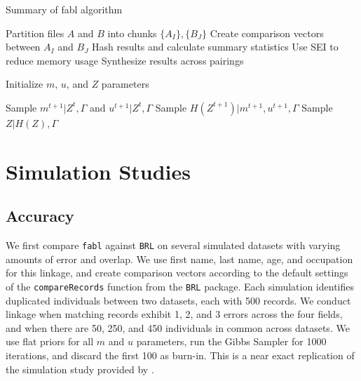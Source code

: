 \documentclass[12pt,letterpaper]{article}
\newcommand{\1}[1]{\mathbb{I}\!\left[#1\right]} %
\begin{document}
\begin{algorithm}
	\caption{Summary of fabl algorithm}
	\begin{algorithmic}[1]
		
		\State Partition files $A$ and $B$ into chunks $\{A_I\}, \{B_J\}$
		\State Create comparison vectors between $A_I$ and $B_J$
		\State Hash results and calculate summary statistics
		\State Use SEI to reduce memory usage
		\EndFor
		\State Synthesize results across pairings
		\EndProcedure
		
		\State Initialize $m$, $u$, and $Z$ parameters
		
		\State Sample $m^{t+1}|Z^{t}, \Gamma$ and  $u^{t+1}|Z^{t}, \Gamma$ 
		\State Sample $H\left(Z^{t+1}\right)|m^{t+1}, u^{t+1}, \Gamma$  
		\EndFor
		\State Sample $Z | H(Z), \Gamma$ 

		\EndProcedure
		
	\end{algorithmic}
\end{algorithm}

\section{Simulation Studies}
\label{sec:simulations}

\hypertarget{accuracy}{%
	\subsection{Accuracy}\label{accuracy}}

We first compare \texttt{fabl} against \texttt{BRL} on several simulated datasets with varying amounts of error and overlap. We use first name, last name, age, and occupation for this linkage, and create comparison vectors according to the default settings of the \texttt{compareRecords} function from the \texttt{BRL} package. Each simulation identifies duplicated individuals between two datasets, each with 500 records. We conduct linkage when matching records exhibit 1, 2, and 3 errors across the four fields, and when there are 50, 250, and 450 individuals in common across datasets. We use flat priors for all $m$ and $u$ parameters, run the Gibbs Sampler for 1000 iterations, and discard the first 100 as burn-in. This is a near exact replication of the simulation study provided by \citep{sadinle2017}. 
\end{document}
